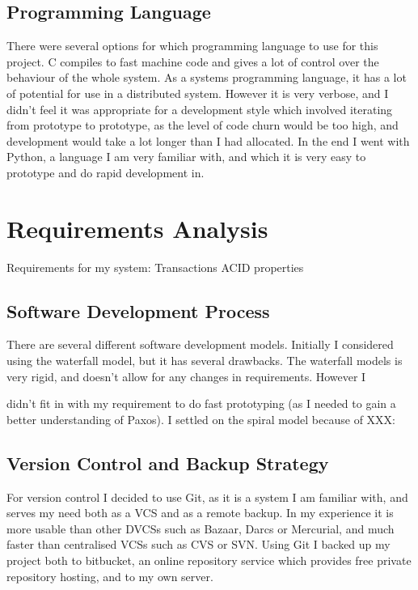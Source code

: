 \documentclass[12pt,twoside,notitlepage]{report}
\begin{document}
\subsection{Programming Language}

There were several options for which programming language to use for this project. C compiles to
fast machine code and gives a lot of control over the behaviour of the whole system. As a systems
programming language, it has a lot of potential for use in a distributed system. However it is very
verbose, and I didn't feel it was appropriate for a development style which involved iterating
from prototype to prototype, as the level of code churn would be too high, and development would
take a lot longer than I had allocated. In the end I went with Python, a language I am very
familiar with, and which it is very easy to prototype and do rapid development in.

\section{Requirements Analysis}

Requirements for my system:
Transactions
ACID properties

\subsection{Software Development Process}

There are several different software development models. Initially I considered using the
waterfall model, but it has several drawbacks. The waterfall models is very rigid, and doesn't
allow for any changes in requirements. However I 

didn't fit in with my requirement to do fast prototyping (as I needed to
gain a better understanding of Paxos). I settled on the spiral model
because of XXX:

\subsection{Version Control and Backup Strategy}

For version control I decided to use Git, as it is a system I am familiar with, and serves my need
both as a VCS and as a remote backup. In my experience it is more usable than other DVCSs such as
Bazaar, Darcs or Mercurial, and much faster than centralised VCSs such as CVS or SVN. Using Git I
backed up my project both to bitbucket, an online repository service which provides free private
repository hosting, and to my own server.
\end{document}
